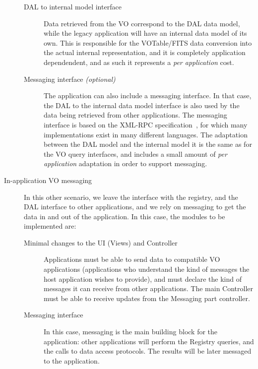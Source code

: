 \begin{description}
\begin{description}
				\item[DAL to internal model interface] Data
				retrieved from the VO correspond to the DAL data
				model, while the legacy application will have an
				internal data model of its own. This is responsible
				for the VOTable/FITS data conversion into the
				actual internal representation, and it is
				completely application dependendent, and as such it
				represents a \emph{per application} cost.
				
				\item[Messaging interface \emph{(optional)}] 
				The application can also include a messaging
				interface. In that case, the DAL to the internal
				data model interface is also used by the data being
				retrieved from other applications. The messaging
				interface is based on the
				XML-RPC
				specification~\cite{1999xrpc.rept.....W}, for which
				many implementations exist in many different
				languages. The adaptation between the DAL model and
				the internal model it is the same as for the VO
				query interfaces, and includes a small amount of
				\emph{per application} adaptation in order to
				support messaging.
			\end{description}
			
			
			\item[In-application VO messaging] In this other
			scenario, we leave the interface with the registry, and
			the DAL interface to other applications, and we rely on
			messaging to get the data in and out of the
			application. In this case, the modules to be
			implemented are:
			
			\begin{description}
				\item[Minimal changes to the UI (Views) and
				Controller] Applications must be able to send data
				to compatible VO applications (applications who
				understand the kind of messages the host
				application wishes to provide), and must declare
				the kind of messages it can receive from other
				applications. The main Controller must be able to
				receive updates from the Messaging part controller.
				
				\item[Messaging interface] In this case, messaging
				is the main building block for the application:
				other applications will perform the Registry
				queries, and the calls to data access protocols.
				The results will be later messaged to the
				application.
				

\end{description}
\end{description}
